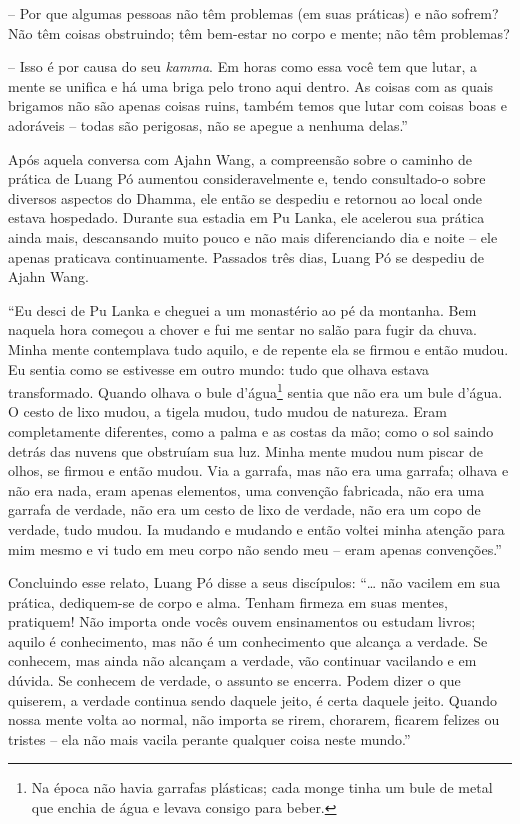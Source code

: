 -- Por que algumas pessoas não têm problemas (em suas práticas) e não
sofrem? Não têm coisas obstruindo; têm bem-estar no corpo e mente; não
têm problemas?

-- Isso é por causa do seu \emph{kamma}. Em horas como essa você tem que
lutar, a mente se unifica e há uma briga pelo trono aqui dentro. As
coisas com as quais brigamos não são apenas coisas ruins, também temos
que lutar com coisas boas e adoráveis -- todas são perigosas, não se
apegue a nenhuma delas.''

Após aquela conversa com Ajahn Wang, a compreensão sobre o caminho de
prática de Luang Pó aumentou consideravelmente e, tendo consultado-o
sobre diversos aspectos do Dhamma, ele então se despediu e retornou ao
local onde estava hospedado. Durante sua estadia em Pu Lanka, ele
acelerou sua prática ainda mais, descansando muito pouco e não mais
diferenciando dia e noite -- ele apenas praticava continuamente.
Passados três dias, Luang Pó se despediu de Ajahn Wang.

``Eu desci de Pu Lanka e cheguei a um monastério ao pé da montanha. Bem
naquela hora começou a chover e fui me sentar no salão para fugir da
chuva. Minha mente contemplava tudo aquilo, e de repente ela se firmou e
então mudou. Eu sentia como se estivesse em outro mundo: tudo que olhava
estava transformado. Quando olhava o bule d'água\footnote{Na época não
  havia garrafas plásticas; cada monge tinha um bule de metal que enchia
  de água e levava consigo para beber.} sentia que não era um bule
d'água. O cesto de lixo mudou, a tigela mudou, tudo mudou de natureza.
Eram completamente diferentes, como a palma e as costas da mão; como o
sol saindo detrás das nuvens que obstruíam sua luz. Minha mente mudou
num piscar de olhos, se firmou e então mudou. Via a garrafa, mas não era
uma garrafa; olhava e não era nada, eram apenas elementos, uma convenção
fabricada, não era uma garrafa de verdade, não era um cesto de lixo de
verdade, não era um copo de verdade, tudo mudou. Ia mudando e mudando e
então voltei minha atenção para mim mesmo e vi tudo em meu corpo não
sendo meu -- eram apenas convenções.''

Concluindo esse relato, Luang Pó disse a seus discípulos: ``\ldots{} não
vacilem em sua prática, dediquem-se de corpo e alma. Tenham firmeza em
suas mentes, pratiquem! Não importa onde vocês ouvem ensinamentos ou
estudam livros; aquilo é conhecimento, mas não é um conhecimento que
alcança a verdade. Se conhecem, mas ainda não alcançam a verdade, vão
continuar vacilando e em dúvida. Se conhecem de verdade, o assunto se
encerra. Podem dizer o que quiserem, a verdade continua sendo daquele
jeito, é certa daquele jeito. Quando nossa mente volta ao normal, não
importa se rirem, chorarem, ficarem felizes ou tristes -- ela não mais
vacila perante qualquer coisa neste mundo.''

